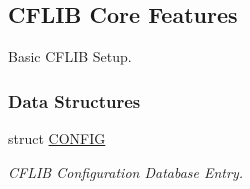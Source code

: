 \hypertarget{group__cflib__core}{
\subsection{CFLIB Core Features}
\label{group__cflib__core}
}
Basic CFLIB Setup.  


\subsubsection*{Data Structures}
\begin{CompactItemize}
\item 
struct \hyperlink{struct_c_o_n_f_i_g}{CONFIG}
\begin{CompactList}\small\item\em CFLIB Configuration Database Entry. \item\end{CompactList}\end{CompactItemize}

